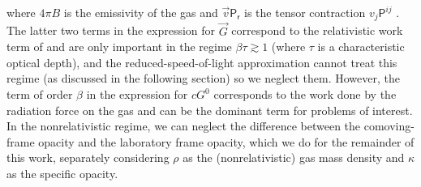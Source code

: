 \documentclass[fleqn,usenatbib]{mnras}
\begin{document}
where $4\pi B$ is the emissivity of the gas and $\vec{v} \mathsf{P_r}$ is the tensor contraction $v_j \mathsf{P}^{ij}$ \citep{Mihalas_1984}. The latter two terms in the expression for $\vec{G}$ correspond to the relativistic work term of \cite{Krumholz_2007} and are only important in the regime $\beta \tau \gtrsim 1$ (where $\tau$ is a characteristic optical depth), and the reduced-speed-of-light approximation cannot treat this regime (as discussed in the following section) so we neglect them. However, the term of order $\beta$ in the expression for $cG^0$ corresponds to the work done by the radiation force on the gas and can be the dominant term for problems of interest. In the nonrelativistic regime, we can neglect the difference between the comoving-frame opacity and the laboratory frame opacity, which we do for the remainder of this work, separately considering $\rho$ as the (nonrelativistic) gas mass density and $\kappa$ as the specific opacity.
\end{document}

